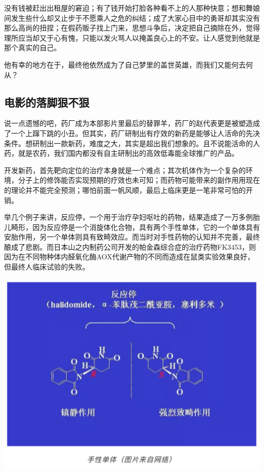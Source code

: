 \documentclass[]{book}
\begin{document}
没有钱被赶出出租屋的窘迫；有了钱开始打脸各种看不上的人那种快意；想和舞娘间发生些什么却又止步于不愿乘人之危的纠结；成了大家心目中的勇哥却其实没有那么高尚的扭捏；在假药贩子找上门来，思想斗争后，决定把自己摘除在外，觉得理所应当却又于心有愧，只能以发火骂人以掩盖良心上的不安。让人感觉到他就是那个真实的自己。

他有幸的地方在于，最终他依然成为了自己梦里的盖世英雄，而我们又能何去何从？

\hypertarget{ux7535ux5f71ux7684ux843dux811aux72e0ux4e0dux72e0}{%
\subsection{电影的落脚狠不狠}\label{ux7535ux5f71ux7684ux843dux811aux72e0ux4e0dux72e0}}

说一点遗憾的吧，药厂成为本部影片里最后的替罪羊，药厂的赵代表更是被塑造成了一个上蹿下跳的小丑。但其实，药厂研制出有疗效的新药是能够让人活命的先决条件。想研制出一款新药，难度之大，其实是超出我们想象的。且不说能活命的人药，就是农药，我们国内都没有自主研制出的高效低毒能全球推广的产品。

开发新药，首先靶向定位的治疗本身就是一个难点；其次机体作为一个复杂的环境，分子上的修饰能否实现预期的疗效也未可知；而药物可能带来的副作用用现在的理论并不能完全预测；哪怕前面一帆风顺，最后上临床更是一笔非常可怕的开销。

举几个例子来讲，反应停，一个用于治疗孕妇呕吐的药物，结果造成了一万多例胎儿畸形，因为反应停是一个消旋体化合物，具有两个手性单体，它的一个单体具有安胎作用，另一个单体则具有致畸效应。而当时对手性药物的认知并不完善，最终酿成了悲剧。而日本山之内制药公司开发的帕金森综合症的治疗药物FK3453，则因为在不同物种体内醛氧化酶AOX代谢产物的不同而造成在鼠类实验效果良好，但最终人临床试验的失败。

\includegraphics[width=6.67in]{images/yaoshen2}
\end{document}
